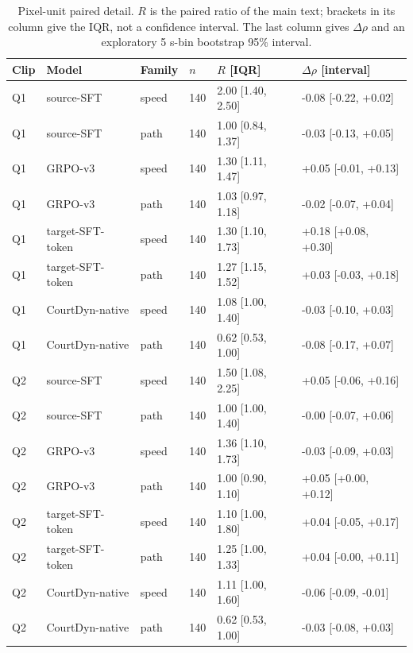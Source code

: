 \documentclass[11pt]{article}
\begin{document}
\begin{table}[t]
\centering\footnotesize
\setlength{\tabcolsep}{3pt}
\caption{Pixel-unit paired detail. $R$ is the paired ratio of the main text; brackets
  in its column give the IQR, not a confidence interval. The last column gives
  $\Delta\rho$ and an exploratory 5 s-bin bootstrap 95\% interval.}
\label{tab:paired-detail}
\begin{tabular}{llllll}
\toprule
Clip & Model & Family & $n$ & $R$ [IQR] & $\Delta\rho$ [interval] \\
\midrule
Q1 & source-SFT & speed & 140 & 2.00 [1.40, 2.50] & -0.08 [-0.22, +0.02] \\
Q1 & source-SFT & path & 140 & 1.00 [0.84, 1.37] & -0.03 [-0.13, +0.05] \\
Q1 & GRPO-v3 & speed & 140 & 1.30 [1.11, 1.47] & +0.05 [-0.01, +0.13] \\
Q1 & GRPO-v3 & path & 140 & 1.03 [0.97, 1.18] & -0.02 [-0.07, +0.04] \\
Q1 & target-SFT-token & speed & 140 & 1.30 [1.10, 1.73] & +0.18 [+0.08, +0.30] \\
Q1 & target-SFT-token & path & 140 & 1.27 [1.15, 1.52] & +0.03 [-0.03, +0.18] \\
Q1 & CourtDyn-native & speed & 140 & 1.08 [1.00, 1.40] & -0.03 [-0.10, +0.03] \\
Q1 & CourtDyn-native & path & 140 & 0.62 [0.53, 1.00] & -0.08 [-0.17, +0.07] \\
Q2 & source-SFT & speed & 140 & 1.50 [1.08, 2.25] & +0.05 [-0.06, +0.16] \\
Q2 & source-SFT & path & 140 & 1.00 [1.00, 1.40] & -0.00 [-0.07, +0.06] \\
Q2 & GRPO-v3 & speed & 140 & 1.36 [1.10, 1.73] & -0.03 [-0.09, +0.03] \\
Q2 & GRPO-v3 & path & 140 & 1.00 [0.90, 1.10] & +0.05 [+0.00, +0.12] \\
Q2 & target-SFT-token & speed & 140 & 1.10 [1.00, 1.80] & +0.04 [-0.05, +0.17] \\
Q2 & target-SFT-token & path & 140 & 1.25 [1.00, 1.33] & +0.04 [-0.00, +0.11] \\
Q2 & CourtDyn-native & speed & 140 & 1.11 [1.00, 1.60] & -0.06 [-0.09, -0.01] \\
Q2 & CourtDyn-native & path & 140 & 0.62 [0.53, 1.00] & -0.03 [-0.08, +0.03] \\
\bottomrule
\end{tabular}
\end{table}
\end{document}
